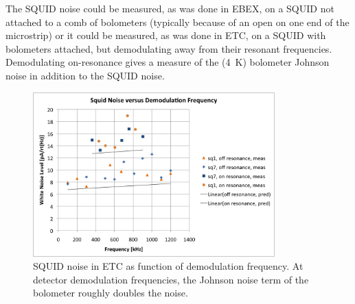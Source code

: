 The \ac{SQUID} noise could be measured, as was done in \ac{EBEX}, on a \ac{SQUID} not attached to a comb of bolometers (typically because of an open on one end of the microstrip) or it could be measured, as was done in \ac{ETC}, on a \ac{SQUID} with bolometers attached, but demodulating away from their resonant frequencies. 
Demodulating on-resonance gives a measure of the (4~K) bolometer Johnson noise in addition to the \ac{SQUID} noise.  



\begin{figure}[ht!]
\begin{center}
\includegraphics[height=2.5in]{figures/squidnoise_temp}
\caption{\ac{SQUID} noise in \ac{ETC} as function of demodulation frequency. At detector demodulation frequencies, the Johnson noise term of the bolometer roughly doubles the noise.
\label{fig:dark_squid_noise} }
\end{center}
\end{figure}




